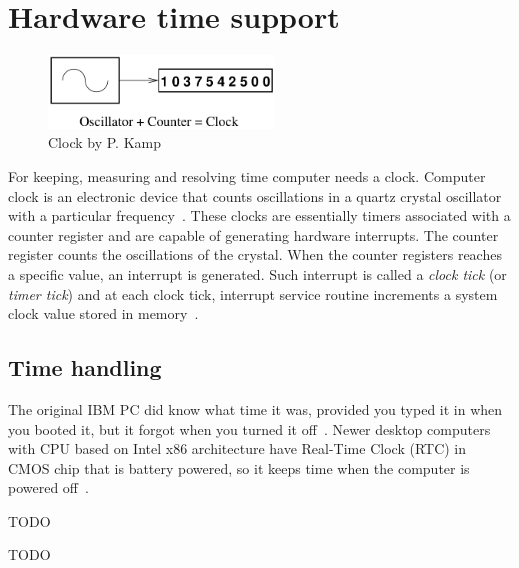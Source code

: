 
\chapter{Hardware time support}
\begin{figure}
	\centering
	\includegraphics[width=6cm,keepaspectratio]{fig/clock.png}
	\caption{Clock by P. Kamp}
	\label{fig:hw-clock}
\end{figure}
For keeping, measuring and resolving time computer needs a clock.
Computer clock is an electronic device that counts oscillations in a
quartz crystal oscillator with a particular frequency~\cite{thesis-sync}.
These clocks are essentially timers associated with a counter register and
are capable of generating hardware interrupts.
The counter register counts the oscillations of the crystal.
When the counter registers reaches a specific value,
an interrupt is generated.
Such interrupt is called a {\it{clock tick}} (or {\it{timer tick}}) and at each clock tick,
interrupt service routine increments a system clock value stored in memory~\cite{thesis-sync}.

\section{Time handling}
The original IBM PC did know what time it was, provided you typed it in when you booted it,
but it forgot when you turned it off~\cite{timecounters}.
Newer desktop computers with CPU based on Intel x86 architecture
have Real-Time Clock (RTC) in CMOS chip that is battery powered,
so it keeps time when the computer is powered off~\cite{timecounters}.

TODO

TODO



